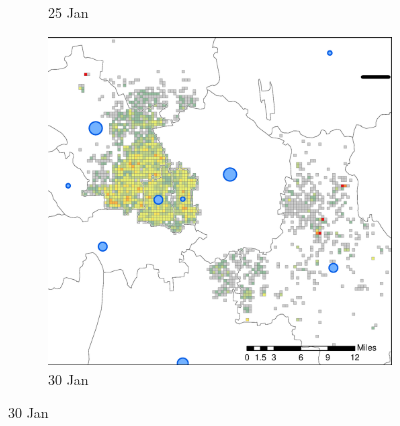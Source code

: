 \documentclass[preprints,ijgi,submit,moreauthors]{Definitions/mdpi}
\begin{document}
\begin{figure}[H]
\begin{subfigure}{.3\textwidth}
        \caption{25 Jan}
    \end{subfigure}
    \begin{subfigure}{.3\textwidth}
        \includegraphics[width=\textwidth]{Figures/Figure7/NewDistrictSSBD2020_01_30.eps}
        \caption{30 Jan}
    \end{subfigure}


\end{figure}
\end{document}
